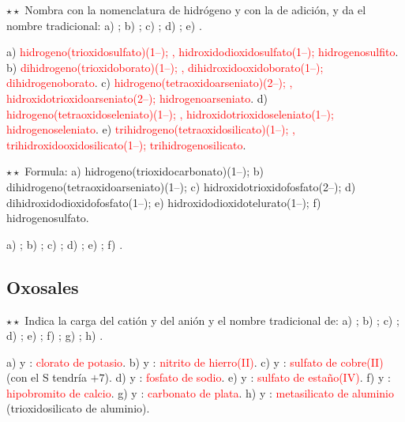 \begin{exercise}
    \(\star\star\) Nombra con la nomenclatura de hidrógeno y con la de adición, y da el nombre tradicional: a) ; b)
    ; c) ; d) ; e) .
    \begin{solu}
        a) \textcolor{red}{hidrogeno(trioxidosulfato)(1\nobreakdash--); , hidroxidodioxidosulfato(1\nobreakdash--); hidrogenosulfito}.
        b) \textcolor{red}{dihidrogeno(trioxidoborato)(1\nobreakdash--); , dihidroxidooxidoborato(1\nobreakdash--); dihidrogenoborato}.
        c) \textcolor{red}{hidrogeno(tetraoxidoarseniato)(2\nobreakdash--); , hidroxidotrioxidoarseniato(2\nobreakdash--);
        hidrogenoarseniato}. d) \textcolor{red}{hidrogeno(tetraoxidoseleniato)(1\nobreakdash--); ,
        hidroxidotrioxidoseleniato(1\nobreakdash--); hidrogenoseleniato}. e) \textcolor{red}{trihidrogeno(tetraoxidosilicato)(1\nobreakdash--);
        , trihidroxidooxidosilicato(1\nobreakdash--); trihidrogenosilicato}.
    \end{solu}
\end{exercise}

\begin{exercise}
    \(\star\star\) Formula: a) hidrogeno(trioxidocarbonato)(1\nobreakdash--); b) dihidrogeno(tetraoxidoarseniato)(1\nobreakdash--); c)
    hidroxidotrioxidofosfato(2\nobreakdash--); d) dihidroxidodioxidofosfato(1\nobreakdash--); e) hidroxidodioxidotelurato(1\nobreakdash--); f) hidrogenosulfato.
    \begin{solu}
        a) \textcolor{red}{}; b) \textcolor{red}{}; c) \textcolor{red}{}; d)
        \textcolor{red}{}; e) \textcolor{red}{}; f) \textcolor{red}{}.
    \end{solu}
\end{exercise}

\subsection{Oxosales}

\begin{exercise}
    \(\star\star\) Indica la carga del catión y del anión y el nombre tradicional de: a) ; b) ; c)
    ; d) ; e) ; f) ; g) ; h) .
    \begin{solu}
        a)  y : \textcolor{red}{clorato de potasio}. b)  y : \textcolor{red}{nitrito de
        hierro(II)}. c)  y : \textcolor{red}{sulfato de cobre(II)} (con  el S tendría \(+7\)). d)
         y : \textcolor{red}{fosfato de sodio}. e)  y : \textcolor{red}{sulfato de
        estaño(IV)}. f)  y : \textcolor{red}{hipobromito de calcio}. g)  y :
        \textcolor{red}{carbonato de plata}. h)  y : \textcolor{red}{metasilicato de aluminio}
        (trioxidosilicato de aluminio).
    \end{solu}
\end{exercise}

